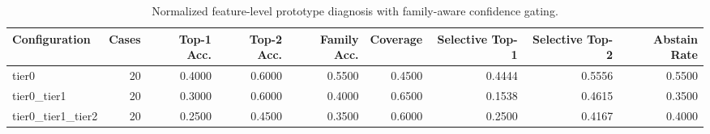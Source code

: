 \begin{table}[t]
\centering
\caption{Normalized feature-level prototype diagnosis with family-aware confidence gating.}
\label{tab:dice_stressor_hierarchical_diagnosis}
\footnotesize
\begin{tabular}{lrrrrrrrr}
\toprule
Configuration & Cases & Top-1 Acc. & Top-2 Acc. & Family Acc. & Coverage & Selective Top-1 & Selective Top-2 & Abstain Rate \\
\midrule
tier0 & 20 & 0.4000 & 0.6000 & 0.5500 & 0.4500 & 0.4444 & 0.5556 & 0.5500 \\
tier0_tier1 & 20 & 0.3000 & 0.6000 & 0.4000 & 0.6500 & 0.1538 & 0.4615 & 0.3500 \\
tier0_tier1_tier2 & 20 & 0.2500 & 0.4500 & 0.3500 & 0.6000 & 0.2500 & 0.4167 & 0.4000 \\
\bottomrule
\end{tabular}

\end{table}
